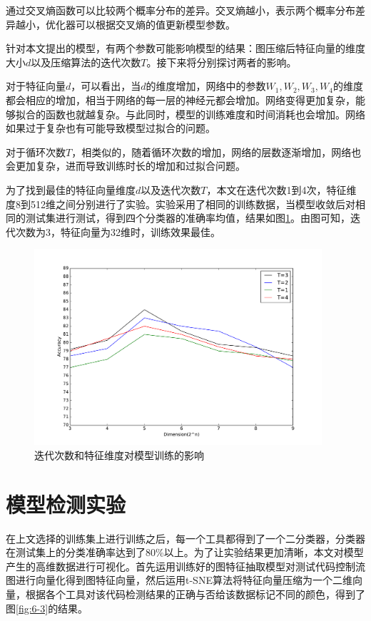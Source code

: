 通过交叉熵函数可以比较两个概率分布的差异。交叉熵越小，表示两个概率分布差异越小，优化器可以根据交叉熵的值更新模型参数。

针对本文提出的模型，有两个参数可能影响模型的结果：图压缩后特征向量的维度大小$d$以及压缩算法的迭代次数$T$。接下来将分别探讨两者的影响。


对于特征向量$d$，可以看出，当$d$的维度增加，网络中的参数$W_1, W_2, W_3, W_4$的维度都会相应的增加，相当于网络的每一层的神经元都会增加。网络变得更加复杂，能够拟合的函数也就越复杂。与此同时，模型的训练难度和时间消耗也会增加。网络如果过于复杂也有可能导致模型过拟合的问题。

对于循环次数$T$，相类似的，随着循环次数的增加，网络的层数逐渐增加，网络也会更加复杂，进而导致训练时长的增加和过拟合问题。

为了找到最佳的特征向量维度$d$以及迭代次数$T$，本文在迭代次数1到4次，特征维度8到512维之间分别进行了实验。实验采用了相同的训练数据，当模型收敛后对相同的测试集进行测试，得到四个分类器的准确率均值，结果如图\ref{mid}。由图可知，迭代次数为3，特征向量为32维时，训练效果最佳。
\begin{figure}[htbp]
	\begin{center}
		\includegraphics[width=0.95\textwidth]{figures/9.pdf}
		\caption{迭代次数和特征维度对模型训练的影响}
		\label{mid}
	\end{center}
\end{figure}
\section{模型检测实验}
在上文选择的训练集上进行训练之后，每一个工具都得到了一个二分类器，分类器在测试集上的分类准确率达到了80\%以上。为了让实验结果更加清晰，本文对模型产生的高维数据进行可视化。首先运用训练好的图特征抽取模型对测试代码控制流图进行向量化得到图特征向量，然后运用t-SNE算法将特征向量压缩为一个二维向量，根据各个工具对该代码检测结果的正确与否给该数据标记不同的颜色，得到了图\ref{fig:6-3}的结果。

